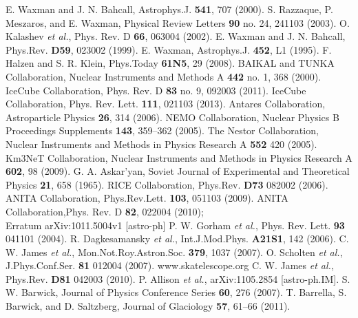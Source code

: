 \begin{thebibliography}{1}
 E. Waxman and J. N. Bahcall, Astrophys.J. \textbf{541}, 707 (2000).
 S. Razzaque, P. Meszaros, and E. Waxman, Physical Review Letters \textbf{90} no. 24, 241103 (2003).
 O. Kalashev {\it et al.}, Phys. Rev. D \textbf{66}, 063004 (2002).
 E. Waxman and J. N. Bahcall, Phys.Rev. \textbf{D59},  023002 (1999).
  E. Waxman,  Astrophys.J. \textbf{452},  L1 (1995).
 F. Halzen and S. R. Klein, Phys.Today \textbf{61N5}, 29 (2008).
 BAIKAL and TUNKA Collaboration, Nuclear Instruments and Methods A \textbf{442} no. 1, 368 (2000).
 IceCube Collaboration, Phys. Rev. D \textbf{83} no. 9,  092003 (2011).
 IceCube Collaboration, Phys. Rev. Lett. \textbf{111}, 021103 (2013).
 Antares Collaboration, Astroparticle Physics \textbf{26}, 314 (2006).
 NEMO Collaboration, Nuclear Physics B Proceedings Supplements \textbf{143},  359–362 (2005).
  The Nestor Collaboration,  Nuclear Instruments and Methods in Physics Research A \textbf{552} 420 (2005).
  Km3NeT Collaboration, Nuclear Instruments and Methods in Physics Research A \textbf{602}, 98 (2009).
  G. A. Askar’yan, Soviet Journal of Experimental and Theoretical Physics \textbf{21}, 658 (1965).
 RICE Collaboration, Phys.Rev. \textbf{D73}  082002 (2006).
 ANITA Collaboration, Phys.Rev.Lett. \textbf{103},  051103 (2009).
ANITA Collaboration,Phys. Rev. D \textbf{82}, 022004 (2010);\\
Erratum arXiv:1011.5004v1 [astro-ph]
  P. W. Gorham {\it et al.},  Phys. Rev. Lett. \textbf{93}  041101 (2004).
 R. Dagkesamansky {\it et al.}, Int.J.Mod.Phys. \textbf{A21S1},  142 (2006).
 C. W. James {\it et al.}, Mon.Not.Roy.Astron.Soc. \textbf{379}, 1037 (2007).
  O. Scholten {\it et al.}, J.Phys.Conf.Ser. \textbf{81}  012004 (2007).
 www.skatelescope.org
  C. W. James {\it et al.}, Phys.Rev. \textbf{D81}  042003 (2010).
 P. Allison {\it et al.}, arXiv:1105.2854 [astro-ph.IM].
 S. W. Barwick, Journal of Physics Conference Series \textbf{60}, 276 (2007).
  T. Barrella, S. Barwick, and D. Saltzberg, Journal of Glaciology \textbf{57}, 61–66 (2011).

\end{thebibliography}

